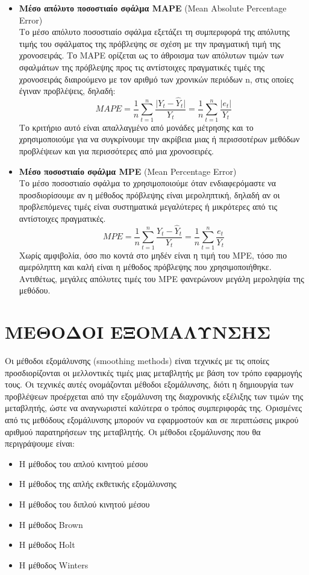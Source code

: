 \begin{itemize}
\item \textbf{Μέσο απόλυτο ποσοστιαίο σφάλμα MAPE} (Mean Absolute Percentage
Error)\\
Το μέσο απόλυτο ποσοστιαίο σφάλμα εξετάζει τη συμπεριφορά της απόλυτης
τιμής του σφάλματος της πρόβλεψης σε σχέση με την πραγματική τιμή της
χρονοσειράς. Το MAPE ορίζεται ως το άθροισμα των απόλυτων τιμών των
σφαλμάτων της πρόβλεψης προς τις αντίστοιχες πραγματικές τιμές της χρονοσειράς
διαιρούμενο με τον αριθμό των χρονικών περιόδων n, στις οποίες έγιναν προβλέψεις,
δηλαδή:\\
$$MAPE= \frac{1}{n} \sum_{t=1}^n \frac{\vert Y_t-\widehat{Y}_t \vert}{Y_t}=\frac{1}{n}\sum_{t=1}^n \frac{\vert e_t \vert}{Y_t} $$
Το κριτήριο αυτό είναι απαλλαγμένο από μονάδες μέτρησης και το
χρησιμοποιούμε για να συγκρίνουμε την ακρίβεια μιας ή περισσοτέρων μεθόδων
προβλέψεων και για περισσότερες από μια χρονοσειρές.

\item \textbf{Μέσο ποσοστιαίο σφάλμα MPE} (Mean Percentage Error)\\
Το μέσο ποσοστιαίο σφάλμα το χρησιμοποιούμε όταν ενδιαφερόμαστε να
προσδιορίσουμε αν η μέθοδος πρόβλεψης είναι μεροληπτική, δηλαδή αν οι
προβλεπόμενες τιμές είναι συστηματικά μεγαλύτερες ή μικρότερες από τις
αντίστοιχες πραγματικές.\\
$$ MPE= \frac{1}{n} \sum_{t=1}^n \frac{Y_t-\widehat{Y}_t}{Y_t} =\frac{1}{n} \sum_{t=1}^n \frac{e_t}{Y_t}$$
Χωρίς αμφιβολία, όσο πιο κοντά στο μηδέν είναι η τιμή του MPE, τόσο πιο
αμερόληπτη και καλή είναι η μέθοδος πρόβλεψης που χρησιμοποιήθηκε. Αντιθέτως,
μεγάλες απόλυτες τιμές του MPE φανερώνουν μεγάλη μεροληψία της μεθόδου.


\end{itemize}


\section{ΜΕΘΟΔΟΙ ΕΞΟΜΑΛΥΝΣΗΣ}

Οι μέθοδοι εξομάλυνσης (smoothing methods) είναι τεχνικές με τις οποίες
προσδιορίζονται οι μελλοντικές τιμές μιας μεταβλητής με βάση τον τρόπο εφαρμογής
τους. Οι τεχνικές αυτές ονομάζονται μέθοδοι εξομάλυνσης, διότι η δημιουργία των
προβλέψεων προέρχεται από την εξομάλυνση της διαχρονικής εξέλιξης των τιμών της
μεταβλητής, ώστε να αναγνωριστεί καλύτερα ο τρόπος συμπεριφοράς της. Ορισμένες
από τις μεθόδους εξομάλυνσης μπορούν να εφαρμοστούν και σε περιπτώσεις μικρού
αριθμού παρατηρήσεων της μεταβλητής. Οι μέθοδοι εξομάλυνσης που θα
περιγράψουμε είναι:\\
\begin{itemize}
\item Η μέθοδος του απλού κινητού μέσου
\item Η μέθοδος της απλής εκθετικής εξομάλυνσης
\item Η μέθοδος του διπλού κινητού μέσου
\item Η μέθοδος Brown
\item Η μέθοδος Holt
\item Η μέθοδος Winters
\end{itemize}

